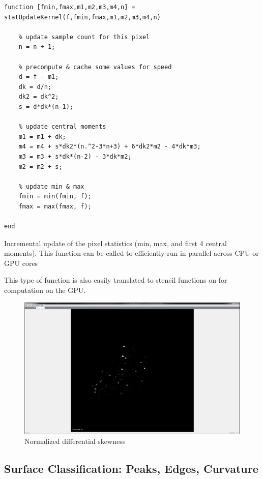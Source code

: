 \begin{listing}[ht]
\begin{verbatim}
function [fmin,fmax,m1,m2,m3,m4,n] = statUpdateKernel(f,fmin,fmax,m1,m2,m3,m4,n)

    % update sample count for this pixel
    n = n + 1;

    % precompute & cache some values for speed
    d = f - m1;
    dk = d/n;
    dk2 = dk^2;
    s = d*dk*(n-1);

    % update central moments
    m1 = m1 + dk;
    m4 = m4 + s*dk2*(n.^2-3*n+3) + 6*dk2*m2 - 4*dk*m3;
    m3 = m3 + s*dk*(n-2) - 3*dk*m2;
    m2 = m2 + s;

    % update min & max
    fmin = min(fmin, f);
    fmax = max(fmax, f);

end
\end{verbatim}
\caption[Incremental update of the pixel statistics (min, max, and first 4 central moments)]{Incremental update of the pixel statistics (min, max, and first 4 central moments). This function can be called to efficiently run in parallel across CPU or GPU cores}
\label{lst:update-statistic-gpu}
\end{listing}

This type of function is also easily translated to stencil functions on for computation on the GPU.

\begin{figure}[htb]\centering
	\includegraphics[width=12cm]{figures/sw-sequence-bw.png}
	\caption{Normalized differential skewness}
\end{figure}

\subsection{Surface Classification: Peaks, Edges, Curvature}\label{sec:surface-classification-peaks-edges-curvature}

